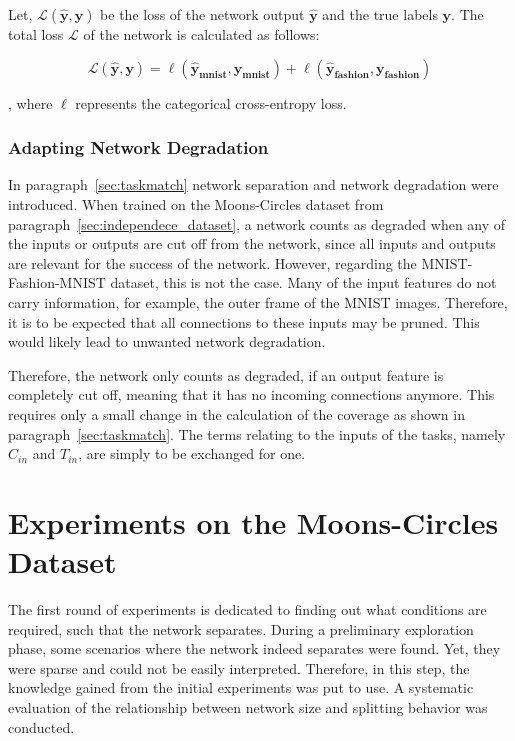 Let, $\mathcal{L} (\mathbf{\hat y}, \mathbf{y})$ be the loss of the network output $\mathbf{\hat y}$ and the true labels $\mathbf{y}$.
The total loss $\mathcal{L}$ of the network is calculated as follows:

\[
\mathcal{L}  (\mathbf{\hat y}, \mathbf{y})
= \ell  (\mathbf{\hat y_{mnist}}, \mathbf{y_{mnist}})
+ \ell (\mathbf{\hat y_{fashion}}, \mathbf{y_{fashion}})
\]

, where $\ell$ represents the categorical cross-entropy loss.

\subsubsection{Adapting Network Degradation}
In paragraph~\ref{sec:taskmatch} network separation and network degradation were introduced.
When trained on the Moons-Circles dataset from paragraph~\ref{sec:independece_dataset}, a network counts as degraded when any of the inputs or outputs are cut off from the network, since all inputs and outputs are relevant for the success of the network.
However, regarding the MNIST-Fashion-MNIST dataset, this is not the case.
Many of the input features do not carry information, for example, the outer frame of the MNIST images.
Therefore, it is to be expected that all connections to these inputs may be pruned.
This would likely lead to unwanted network degradation.

Therefore, the network only counts as degraded, if an output feature is completely cut off, meaning that it has no incoming connections anymore.
This requires only a small change in the calculation of the coverage as shown in paragraph~\ref{sec:taskmatch}.
The terms relating to the inputs of the tasks, namely $C_{in}$ and $T_{in}$, are simply to be exchanged for one.

\section{Experiments on the Moons-Circles Dataset}

The first round of experiments is dedicated to finding out what conditions are required, such that the network separates.
During a preliminary exploration phase, some scenarios where the network indeed separates were found.
Yet, they were sparse and could not be easily interpreted.
Therefore, in this step, the knowledge gained from the initial experiments was put to use.
A systematic evaluation of the relationship between network size and splitting behavior was conducted.

